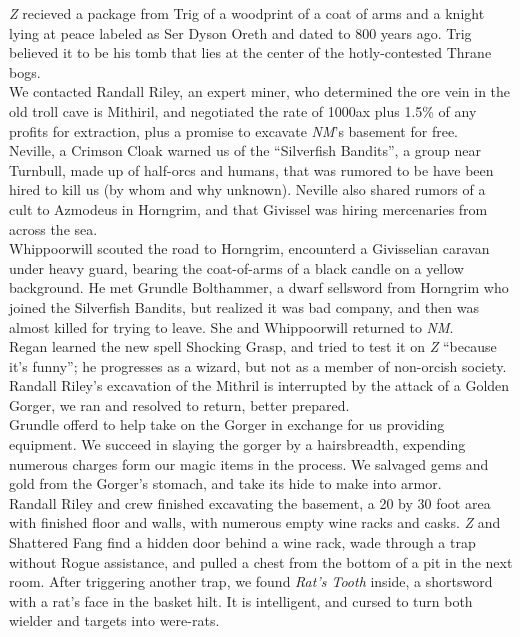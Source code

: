 \documentclass[letterpaper]{article}
\begin{document}
\noindent \emph{Z} recieved a package from Trig of a woodprint of a coat of arms and a knight lying at peace labeled as Ser Dyson Oreth and dated to 800 years ago.  Trig believed it to be his tomb that lies at the center of the hotly-contested Thrane bogs.\\

\noindent We contacted Randall Riley, an expert miner, who determined the ore vein in the old troll cave is Mithiril, and negotiated the rate of 1000ax plus 1.5\% of any profits for extraction, plus a promise to excavate \emph{NM}'s basement for free.\\

\noindent Neville, a Crimson Cloak warned us of the ``Silverfish Bandits'', a group near Turnbull, made up of half-orcs and humans, that was rumored to be have been hired to kill us (by whom and why unknown). Neville also shared rumors of a cult to Azmodeus in Horngrim, and that Givissel was hiring mercenaries from across the sea.\\

\noindent Whippoorwill scouted the road to Horngrim, encounterd a Givisselian caravan under heavy guard, bearing the coat-of-arms of a black candle on a yellow background.  He met Grundle Bolthammer, a dwarf sellsword from Horngrim who joined the Silverfish Bandits, but realized it was bad company, and then was almost killed for trying to leave. She and Whippoorwill returned to \emph{NM}.\\

\noindent Regan learned the new spell Shocking Grasp, and tried to test it on \emph{Z} ``because it's funny''; he progresses as a wizard, but not as a member of non-orcish society.\\

\noindent Randall Riley's excavation of the Mithril is interrupted by the attack of a Golden Gorger, we ran and resolved to return, better prepared.\\

\noindent Grundle offerd to help take on the Gorger in exchange for us providing equipment. We succeed in slaying the gorger by a hairsbreadth, expending numerous charges form our magic items in the process. We salvaged gems and gold from the Gorger's stomach, and take its hide to make into armor.\\

\noindent Randall Riley and crew finished excavating the basement, a 20 by 30 foot area with finished floor and walls, with numerous empty wine racks and casks.  \emph{Z} and Shattered Fang find a hidden door behind a wine rack, wade through a trap without Rogue assistance, and pulled a chest from the bottom of a pit in the next room.  After triggering another trap, we found \emph{Rat's Tooth} inside, a shortsword with a rat's face in the basket hilt.  It is intelligent, and cursed to turn both wielder and targets into were-rats.  \\
\end{document}
